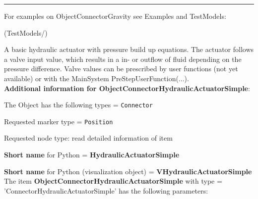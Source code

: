 \vspace{6pt}\par\noindent\rule{\textwidth}{0.4pt}
%
\noindent For examples on ObjectConnectorGravity see Examples and TestModels:
\bi
\item {} (TestModels/)
\ei

%
\newpage

\label{sec:item:ObjectConnectorHydraulicActuatorSimple}
A basic hydraulic actuator with pressure build up equations. The actuator follows a valve input value, which results in a in- or outflow of fluid depending on the pressure difference. Valve values can be prescribed by user functions (not yet available) or with the MainSystem PreStepUserFunction(...).\vspace{12pt}
 \\{\bf Additional information for ObjectConnectorHydraulicActuatorSimple}:
\bi
  \item The Object has the following types = \texttt{Connector}
  \item Requested marker type = \texttt{Position}
  \item Requested node type: read detailed information of item
  \item {\bf Short name} for Python = {\bf HydraulicActuatorSimple}  \item {\bf Short name} for Python (visualization object) = {\bf VHydraulicActuatorSimple}\ei
\vspace{12pt} \noindent The item {\bf ObjectConnectorHydraulicActuatorSimple} with type = 'ConnectorHydraulicActuatorSimple' has the following parameters:\vspace{-1cm}\\ 
